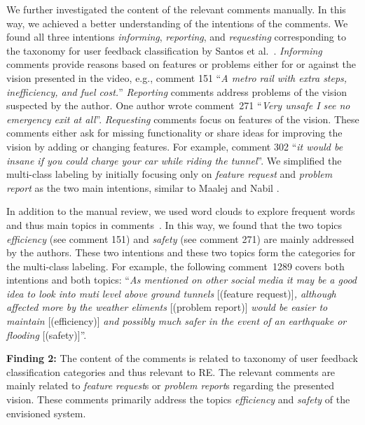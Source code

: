 \documentclass[conference]{IEEEtran}
\makeatletter
\newcommand{\textlabel}[2]{%
	\protected@edef\@currentlabel{#1}%
	\phantomsection%
	\label{#2}%
}
\makeatother
\begin{document}
{We further investigated the content of the relevant comments manually. In this way, we achieved a better understanding of the intentions of the comments. We found all three intentions \textit{informing}, \textit{reporting}, and \textit{requesting} corresponding to the taxonomy for user feedback classification by Santos et al.~\cite{Santos.2019}. \textit{Informing} comments provide reasons based on features or problems either for or against the vision presented in the video, e.g., comment 151 \enquote{\textit{A metro rail with extra steps, inefficiency, and fuel cost.}} \textit{Reporting} comments address problems of the vision suspected by the author. One author wrote comment~271 \enquote{\textit{Very unsafe I see no emergency exit at all}}. \textit{Requesting} comments focus on features of the vision. These comments either ask for missing functionality or share ideas for improving the vision by adding or changing features. For example, comment 302 \enquote{\textit{it would be insane if you could charge your car while riding the tunnel}}. We simplified the multi-class labeling by initially focusing only on \textit{feature request} and \textit{problem report} as the two main intentions, similar to Maalej and Nabil \cite{Maalej.2015}.

In addition to the manual review, we used word clouds to explore frequent words and thus main topics in comments~\cite{Obadimu.2019, Heimerl.2014}. In this way, we found that the two topics \textit{efficiency} (see comment 151) and \textit{safety} (see comment 271) are mainly addressed by the authors. These two intentions and these two topics form the categories for the multi-class labeling. For example, the following comment~1289 covers both intentions and both topics: \enquote{\textit{As mentioned on other social media it may be a good idea to look into muti level above ground tunnels} [(feature request)]\textit{, although affected more by the weather eliments} [(problem report)] \textit{would be easier to maintain} [(efficiency)] \textit{and possibly much safer in the event of an earthquake or flooding} [(safety)]}.

\begin{mdframed}
	\textlabel{\protect Finding 2}{f2}\textbf{Finding 2:}
	The content of the comments is related to taxonomy of user feedback classification categories and thus relevant to RE. The relevant comments are mainly related to \textit{feature request}s or \textit{problem report}s regarding the presented vision. These comments primarily address the topics \textit{efficiency} and \textit{safety} of the envisioned system.
\end{mdframed}

}
\end{document}
